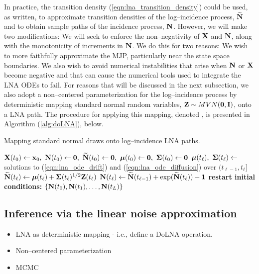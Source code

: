 In practice, the transition density (\ref{eqn:lna_transition_density}) could be used, as written, to approximate transition densities of the log--incidence process, $ \widetilde{\mathbf{N}} $ and to obtain sample paths of the incidence process, $ \mathbf{N} $. However, we will make two modifications: We will seek to enforce the non--negativity of $ \mathbf{X} $ and $ \mathbf{N} $, along with the monotonicity of increments in $ \mathbf{N} $. We do this for two reasons: We wish to more faithfully approximate the MJP, particularly near the state space boundaries. We also wish to avoid numerical instabilities that arise when $ \mathbf{N} $ or $ \mathbf{X} $ become negative and that can cause the numerical tools used to integrate the LNA ODEs to fail. For reasons that will be discussed in the next subsection, we also adopt a non--centered parameterization for the log--incidence process by deterministic mapping standard normal random variables, $ \mathbf{Z}\sim MVN(\boldsymbol{0},\mathbf{I}) $, onto a LNA path.  The procedure for applying this mapping, denoted \doLNA, is presented in Algorithm (\ref{alg:doLNA}), below. 

\begin{algorithm}[h!]
	\caption{Mapping standard normal draws onto log--incidence LNA paths.}
	\label{alg:doLNA}
	\begin{algorithmic}[1]
		\State $ \bX(t_0) \gets \bx_0,\ \bN(t_0) \gets \bs{0},\ \bNtil(t_0) \gets \bs{0},\ \bmu(t_0) \gets \bs{0},\ \bSigma(t_0) \gets \bs{0} $
		\State $ \boldsymbol{\mu}(t_\ell),\ \boldsymbol{\Sigma}(t_\ell) \gets $ solutions to (\ref{eqn:lna_ode_drift}) and (\ref{eqn:lna_ode_diffusion}) over $ (t_{\ell-1}, t_\ell] $
		\State $ \widetilde{\mathbf{N}}(t_\ell)\gets \boldsymbol{\mu}(t_\ell) + \boldsymbol{\Sigma}(t_\ell)^{1/2}\mathbf{Z}(t_\ell) $ 
		\State $ \mathbf{N}(t_\ell)\gets \widetilde{\mathbf{N}}(t_{\ell-1}) + \exp(\widetilde{\mathbf{N}}(t_\ell)) - \boldsymbol{1} $
		\State \textbf{restart initial conditions:} 
		\EndFor
		\State \Return $\lbrace \mathbf{N}(t_0),\mathbf{N}(t_1),\dots,\mathbf{N}(t_L)\rbrace $ 
		\EndProcedure
	\end{algorithmic}
\end{algorithm}

\subsection{Inference via the linear noise approximation}
\label{subsec:lna_inference}


\begin{itemize}
	\item LNA as deterministic mapping - i.e., define a DoLNA operation.
	\item Non--centered parameterization
	\item MCMC
\end{itemize}